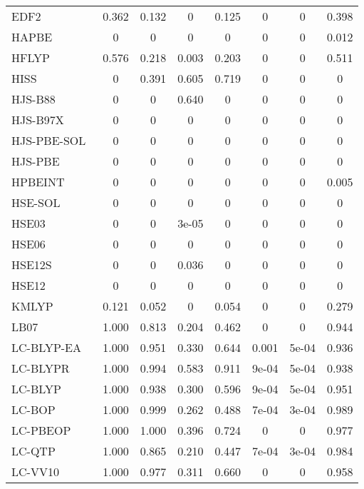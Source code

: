 \begin{table*}
\begin{tabular}{|l|c|c|c|c|c|c|c|}
EDF2~\cite{Lin2004_365} & 0.362 & 0.132 & 0 & 0.125 & 0 & 0 & 0.398 \\
HAPBE~\cite{Fabiano2015_122} & 0 & 0 & 0 & 0 & 0 & 0 & 0.012 \\
HFLYP~\cite{Lee1988_785,Miehlich1989_200} & 0.576 & 0.218 & 0.003 & 0.203 & 0 & 0 & 0.511 \\
HISS~\cite{Henderson2007_221103} & 0 & 0.391 & 0.605 & 0.719 & 0 & 0 & 0 \\
HJS-B88~\cite{Henderson2008_194105} & 0 & 0 & 0.640 & 0 & 0 & 0 & 0 \\
HJS-B97X~\cite{Henderson2008_194105} & 0 & 0 & 0 & 0 & 0 & 0 & 0 \\
HJS-PBE-SOL~\cite{Henderson2008_194105} & 0 & 0 & 0 & 0 & 0 & 0 & 0 \\
HJS-PBE~\cite{Henderson2008_194105} & 0 & 0 & 0 & 0 & 0 & 0 & 0 \\
HPBEINT~\cite{Fabiano2013_673} & 0 & 0 & 0 & 0 & 0 & 0 & 0.005 \\
HSE-SOL~\cite{Schimka2011_024116} & 0 & 0 & 0 & 0 & 0 & 0 & 0 \\
HSE03~\cite{Heyd2003_8207,Heyd2003_8207_err} & 0 & 0 & 3e-05 & 0 & 0 & 0 & 0 \\
HSE06~\cite{Heyd2003_8207,Heyd2003_8207_err,Krukau2006_224106} & 0 & 0 & 0 & 0 & 0 & 0 & 0 \\
HSE12S~\cite{Moussa2012_204117} & 0 & 0 & 0.036 & 0 & 0 & 0 & 0 \\
HSE12~\cite{Moussa2012_204117} & 0 & 0 & 0 & 0 & 0 & 0 & 0 \\
KMLYP~\cite{Kang2001_11040} & 0.121 & 0.052 & 0 & 0.054 & 0 & 0 & 0.279 \\
LB07~\cite{Livshits2007_2932} & 1.000 & 0.813 & 0.204 & 0.462 & 0 & 0 & 0.944 \\
LC-BLYP-EA~\cite{Anderson2017_1656,Tawada2004_8425} & 1.000 & 0.951 & 0.330 & 0.644 & 0.001 & 5e-04 & 0.936 \\
LC-BLYPR~\cite{Ai2021_1207} & 1.000 & 0.994 & 0.583 & 0.911 & 9e-04 & 5e-04 & 0.938 \\
LC-BLYP~\cite{Tawada2004_8425} & 1.000 & 0.938 & 0.300 & 0.596 & 9e-04 & 5e-04 & 0.951 \\
LC-BOP~\cite{Song2007_154105} & 1.000 & 0.999 & 0.262 & 0.488 & 7e-04 & 3e-04 & 0.989 \\
LC-PBEOP~\cite{Tawada2004_8425} & 1.000 & 1.000 & 0.396 & 0.724 & 0 & 0 & 0.977 \\
LC-QTP~\cite{Haiduke2018_184106} & 1.000 & 0.865 & 0.210 & 0.447 & 7e-04 & 3e-04 & 0.984 \\
LC-VV10~\cite{Vydrov2010_244103} & 1.000 & 0.977 & 0.311 & 0.660 & 0 & 0 & 0.958 \\
\bottomrule
\end{tabular}
\end{table*}
